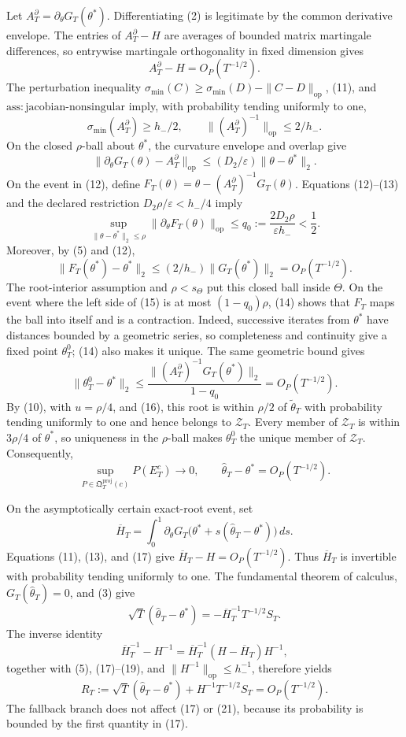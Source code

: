 Let \(A_T^\partial=\partial_\theta G_T(\theta^*)\). Differentiating (2) is legitimate by the common derivative envelope. The entries of \(A_T^\partial-H\) are averages of bounded matrix martingale differences, so entrywise martingale orthogonality in fixed dimension gives
\[
 A_T^\partial-H=O_P(T^{-1/2}).
 \tag{11}
\]
The perturbation inequality \(\sigma_{\min}(C)\ge\sigma_{\min}(D)-\|C-D\|_{\mathrm{op}}\), (11), and \(\mathrm{ass:jacobian\text{-}nonsingular}\) imply, with probability tending uniformly to one,
\[
 \sigma_{\min}(A_T^\partial)\ge h_-/2,
 \qquad \|(A_T^\partial)^{-1}\|_{\mathrm{op}}\le2/h_-.
 \tag{12}
\]
On the closed \(\rho\)-ball about \(\theta^*\), the curvature envelope and overlap give
\[
 \|\partial_\theta G_T(\theta)-A_T^\partial\|_{\mathrm{op}}
 \le (D_2/\varepsilon)\|\theta-\theta^*\|_2.
 \tag{13}
\]
On the event in (12), define \(F_T(\theta)=\theta-(A_T^\partial)^{-1}G_T(\theta)\). Equations (12)--(13) and the declared restriction \(D_2\rho/\varepsilon<h_-/4\) imply
\[
 \sup_{\|\theta-\theta^*\|_2\le\rho}
 \|\partial_\theta F_T(\theta)\|_{\mathrm{op}}
 \le q_0:=\frac{2D_2\rho}{\varepsilon h_-}<\frac12.
 \tag{14}
\]
Moreover, by (5) and (12),
\[
 \|F_T(\theta^*)-\theta^*\|_2
 \le (2/h_-)\|G_T(\theta^*)\|_2=O_P(T^{-1/2}).
 \tag{15}
\]
The root-interior assumption and \(\rho<s_\Theta\) put this closed ball inside \(\Theta\). On the event where the left side of (15) is at most \((1-q_0)\rho\), (14) shows that \(F_T\) maps the ball into itself and is a contraction. Indeed, successive iterates from \(\theta^*\) have distances bounded by a geometric series, so completeness and continuity give a fixed point \(\theta_T^0\); (14) also makes it unique. The same geometric bound gives
\[
 \|\theta_T^0-\theta^*\|_2
 \le \frac{\|(A_T^\partial)^{-1}G_T(\theta^*)\|_2}{1-q_0}
 =O_P(T^{-1/2}).
 \tag{16}
\]
By (10), with \(u=\rho/4\), and (16), this root is within \(\rho/2\) of \(\widetilde\theta_T\) with probability tending uniformly to one and hence belongs to \(\mathcal Z_T\). Every member of \(\mathcal Z_T\) is within \(3\rho/4\) of \(\theta^*\), so uniqueness in the \(\rho\)-ball makes \(\theta_T^0\) the unique member of \(\mathcal Z_T\). Consequently,
\[
 \sup_{P\in\mathfrak Q_T^{\mathrm{proj}}(c)}P(E_T^c)\longrightarrow0,
 \qquad \widehat\theta_T-\theta^*=O_P(T^{-1/2}).
 \tag{17}
\]

On the asymptotically certain exact-root event, set
\[
 \overline H_T=\int_0^1\partial_\theta G_T
 \bigl(\theta^*+s(\widehat\theta_T-\theta^*)\bigr)\,ds.
 \tag{18}
\]
Equations (11), (13), and (17) give \(\overline H_T-H=O_P(T^{-1/2})\). Thus \(\overline H_T\) is invertible with probability tending uniformly to one. The fundamental theorem of calculus, \(G_T(\widehat\theta_T)=0\), and (3) give
\[
 \sqrt T(\widehat\theta_T-\theta^*)
 =-\overline H_T^{-1}T^{-1/2}S_T.
 \tag{19}
\]
The inverse identity
\[
 \overline H_T^{-1}-H^{-1}
 =\overline H_T^{-1}(H-\overline H_T)H^{-1},
 \tag{20}
\]
together with (5), (17)--(19), and \(\|H^{-1}\|_{\mathrm{op}}\le h_-^{-1}\), therefore yields
\[
 R_T:=\sqrt T(\widehat\theta_T-\theta^*)
 +H^{-1}T^{-1/2}S_T=O_P(T^{-1/2}).
 \tag{21}
\]
The fallback branch does not affect (17) or (21), because its probability is bounded by the first quantity in (17).

